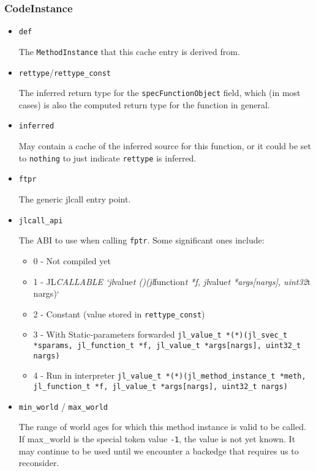 \subsubsection{CodeInstance}



\begin{itemize}
\item \texttt{def}

The \texttt{MethodInstance} that this cache entry is derived from.

\end{itemize}


\begin{itemize}
\item \texttt{rettype}/\texttt{rettype\_const}

The inferred return type for the \texttt{specFunctionObject} field, which (in most cases) is also the computed return type for the function in general.


\item \texttt{inferred}

May contain a cache of the inferred source for this function, or it could be set to \texttt{nothing} to just indicate \texttt{rettype} is inferred.


\item \texttt{ftpr}

The generic jlcall entry point.


\item \texttt{jlcall\_api}

The ABI to use when calling \texttt{fptr}. Some significant ones include:

\begin{itemize}
\item 0 - Not compiled yet


\item 1 - JL\emph{CALLABLE `jl}value\emph{t \emph{(})(jl}function\emph{t *f, jl}value\emph{t *args[nargs], uint32}t nargs)`


\item 2 - Constant (value stored in \texttt{rettype\_const})


\item 3 - With Static-parameters forwarded \texttt{jl\_value\_t *(*)(jl\_svec\_t *sparams, jl\_function\_t *f, jl\_value\_t *args[nargs], uint32\_t nargs)}


\item 4 - Run in interpreter \texttt{jl\_value\_t *(*)(jl\_method\_instance\_t *meth, jl\_function\_t *f, jl\_value\_t *args[nargs], uint32\_t nargs)}

\end{itemize}

\item \texttt{min\_world} / \texttt{max\_world}

The range of world ages for which this method instance is valid to be called. If max\_world is the special token value \texttt{-1}, the value is not yet known. It may continue to be used until we encounter a backedge that requires us to reconsider.

\end{itemize}


